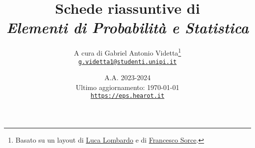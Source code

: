 \documentclass[10pt]{report}
\title{\Huge{Schede riassuntive di \\ \textit{Elementi di Probabilità e Statistica}}}
\date{A.A. 2023-2024 \\[0.6in] Ultimo aggiornamento: \today \\[1in] \href{https://eps.hearot.it}{\texttt{https://eps.hearot.it}}}
\author{A cura di Gabriel Antonio Videtta\footnote{Basato su un layout di \underline{Luca Lombardo} e di \underline{Francesco Sorce}.} \\ \href{mailto:g.videtta1@studenti.unipi.it}{\texttt{g.videtta1@studenti.unipi.it}}}
\begin{document}
\maketitle

\begin{multicols*}{2}
    \tableofcontents
\end{multicols*}

\newpage








\end{document}
